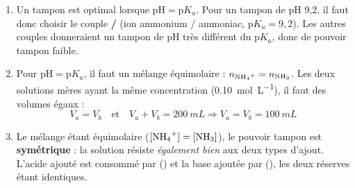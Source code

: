 \documentclass[11pt]{article}
\begin{document}
\begin{corrige}
\begin{enumerate}
  \item Un tampon est optimal lorsque $\mathrm{pH} = \mathrm{p}K_a$. Pour un tampon de pH 9,2, il faut donc choisir le couple \textbf{/} (ion ammonium / ammoniac, $\mathrm{p}K_a = 9,2$). Les autres couples donneraient un tampon de pH très différent du $\mathrm{p}K_a$, donc de pouvoir tampon faible.
  \item Pour $\mathrm{pH} = \mathrm{p}K_a$, il faut un mélange équimolaire : $n_{\ce{NH4+}} = n_{\ce{NH3}}$. Les deux solutions mères ayant la même concentration (\SI{0,10}{mol.L^{-1}}), il faut des volumes égaux :
  \[
  V_a = V_b \quad \text{et} \quad V_a + V_b = \SI{200}{mL} \Rightarrow \boxed{V_a = V_b = \SI{100}{mL}}
  \]
  \item Le mélange étant équimolaire ($[\ce{NH4+}] = [\ce{NH3}]$), le pouvoir tampon est \textbf{symétrique} : la solution résiste \emph{également bien} aux deux types d'ajout. L'acide ajouté est consommé par  () et la base ajoutée par  (), les deux réserves étant identiques.
\end{enumerate}
\end{corrige}
\end{document}
